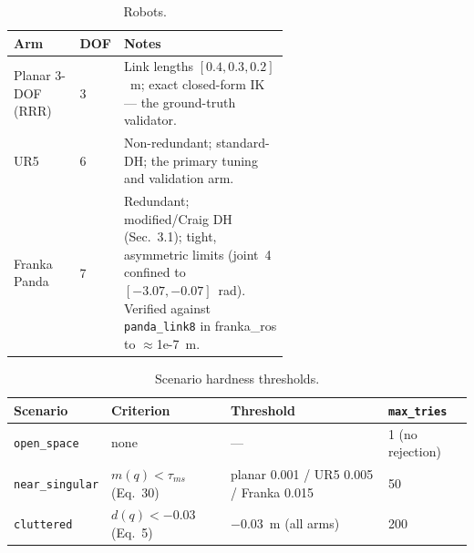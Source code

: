 \begin{table}[t]
\centering
\caption{Robots.}
\label{tab:robots}
\begin{tabular}{@{}llp{0.60\linewidth}@{}}
\toprule
Arm & DOF & Notes \\
\midrule
Planar 3-DOF (RRR) & 3 & Link lengths $[0.4,0.3,0.2]$~m; exact closed-form IK --- the ground-truth validator. \\
UR5          & 6 & Non-redundant; standard-DH; the primary tuning and validation arm. \\
Franka Panda & 7 & Redundant; modified/Craig DH (Sec.~3.1); tight, asymmetric limits (joint~4 confined to $[-3.07,-0.07]$~rad). Verified against \texttt{panda\_link8} in franka\_ros to $\approx$1e-7~m. \\
\bottomrule
\end{tabular}
\end{table}

\begin{table}[t]
\centering
\caption{Scenario hardness thresholds.}
\label{tab:thresholds}
\begin{tabular}{@{}llll@{}}
\toprule
Scenario & Criterion & Threshold & \texttt{max\_tries} \\
\midrule
\texttt{open\_space}    & none                     & ---                                             & 1 (no rejection) \\
\texttt{near\_singular} & $m(q)<\tau_{ms}$ (Eq.~30)& planar 0.001 / UR5 0.005 / Franka 0.015         & 50 \\
\texttt{cluttered}      & $d(q)<-0.03$ (Eq.~5)     & $-0.03$~m (all arms)                            & 200 \\
\bottomrule
\end{tabular}
\end{table}

